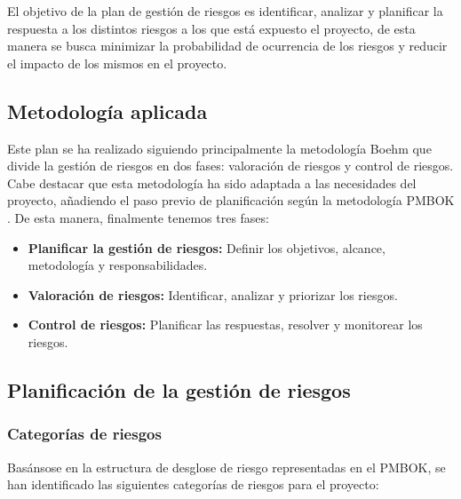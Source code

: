 El objetivo de la plan de gestión de riesgos es identificar, analizar y planificar la respuesta a los distintos riesgos a los que está expuesto el proyecto, de esta manera se busca minimizar la probabilidad de ocurrencia de los riesgos y reducir el impacto de los mismos en el proyecto.
\subsection*{Metodología aplicada}
Este plan se ha realizado siguiendo principalmente la metodología Boehm \cite{boehm1991} que divide la gestión de riesgos en dos fases: valoración de riesgos y control de riesgos. Cabe destacar que esta metodología ha sido adaptada a las necesidades del proyecto, añadiendo el paso previo de planificación según la metodología PMBOK \cite{pmbok2013}. De esta manera, finalmente tenemos tres fases:

\begin{itemize}
    \item \textbf{Planificar la gestión de riesgos:} Definir los objetivos, alcance, metodología y responsabilidades.
    \item \textbf{Valoración de riesgos:} Identificar, analizar y priorizar los riesgos.
    \item \textbf{Control de riesgos:} Planificar las respuestas, resolver y monitorear los riesgos.
\end{itemize}

\subsection*{Planificación de la gestión de riesgos}
\subsubsection*{Categorías de riesgos}
Basánsose en la estructura de desglose de riesgo representadas en el PMBOK, se han identificado las siguientes categorías de riesgos para el proyecto:

